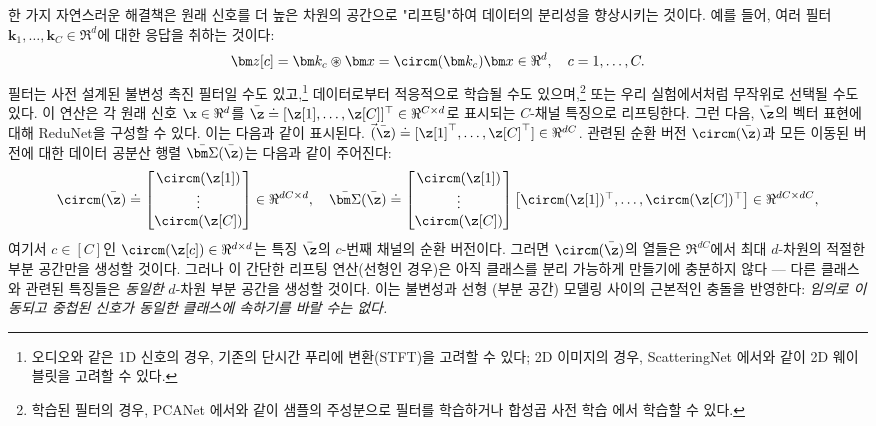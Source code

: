 \documentclass[../../book-main_ko.tex]{subfiles}
\begin{document}
한 가지 자연스러운 해결책은 원래 신호를 더 높은 차원의 공간으로 "리프팅"하여 데이터의 분리성을 향상시키는 것이다. 예를 들어, 여러 필터 $\bm k_1, \ldots, \bm k_C \in \Re^d$에 대한 응답을 취하는 것이다:
\begin{equation}
\bm z[c] = \bm k_c \circledast \bm x  =  \circm(\bm k_c) \bm x \in \Re^d, \quad c = 1, \ldots, C.
\label{eqn:lift-1d}
\end{equation} 
필터는 사전 설계된 불변성 촉진 필터일 수도 있고,\footnote{오디오와 같은 1D 신호의 경우, 기존의 단시간 푸리에 변환(STFT)을 고려할 수 있다; 2D 이미지의 경우, ScatteringNet \cite{scattering-net}에서와 같이 2D 웨이블릿을 고려할 수 있다.} 데이터로부터 적응적으로 학습될 수도 있으며,\footnote{학습된 필터의 경우, PCANet \cite{chan2015pcanet}에서와 같이 샘플의 주성분으로 필터를 학습하거나 합성곱 사전 학습 \cite{li2019multichannel,qu2019nonconvex}에서 학습할 수 있다.} 또는 우리 실험에서처럼 무작위로 선택될 수도 있다. 이 연산은 각 원래 신호 $\x \in \Re^d$를 $\bar{\z}  \doteq [\z[1], \ldots, \z[C]]^\top \in \Re^{C\times d}$로 표시되는 $C$-채널 특징으로 리프팅한다. 
그런 다음, $\bar{\z}$의 벡터 표현에 대해 ReduNet을 구성할 수 있다. 이는 다음과 같이 표시된다.
$\vec(\bar\z) \doteq [\z[1]^\top, \ldots, \z[C]^\top] \in \Re^{dC}$. 
관련된 순환 버전 $ \circm(\bar{\z})$과 모든 이동된 버전에 대한 데이터 공분산 행렬 $\bar{\bm \Sigma}(\bar\z)$는 다음과 같이 주어진다:
\begin{equation}
\begin{aligned}
 \circm(\bar{\z}) \doteq \left[\begin{matrix}
    \circm(\z[1])  \\ \vdots \\ \circm(\z[C]) \end{matrix} \right] \in \Re^{dC\times d}, 
    \quad  \bar{\bm \Sigma}(\bar\z) \doteq 
    \left[\begin{matrix}
    \circm(\z[1]) \\ \vdots \\ \circm(\z[C]) \end{matrix} \right]
    \left[\begin{matrix}\circm(\z[1])^\top,\ldots, \circm(\z[C])^\top\end{matrix} \right] \in \Re^{dC\times dC},
    \label{eqn:W-multichannel}
\end{aligned}
\end{equation}
여기서 $c \in [C]$인 $\circm(\z[c]) \in \Re^{d\times d}$는 특징 $\bar \z$의 $c$-번째 채널의 순환 버전이다. 그러면 $\circm(\bar\z)$의 열들은 $\Re^{dC}$에서 최대 $d$-차원의 적절한 부분 공간만을 생성할 것이다. 그러나 이 간단한 리프팅 연산(선형인 경우)은 아직 클래스를 분리 가능하게 만들기에 충분하지 않다 --- 다른 클래스와 관련된 특징들은 {\em 동일한} $d$-차원 부분 공간을 생성할 것이다. 이는 불변성과 선형 (부분 공간) 모델링 사이의 근본적인 충돌을 반영한다: {\em 임의로 이동되고 중첩된 신호가 동일한 클래스에 속하기를 바랄 수는 없다.}
\end{document}
